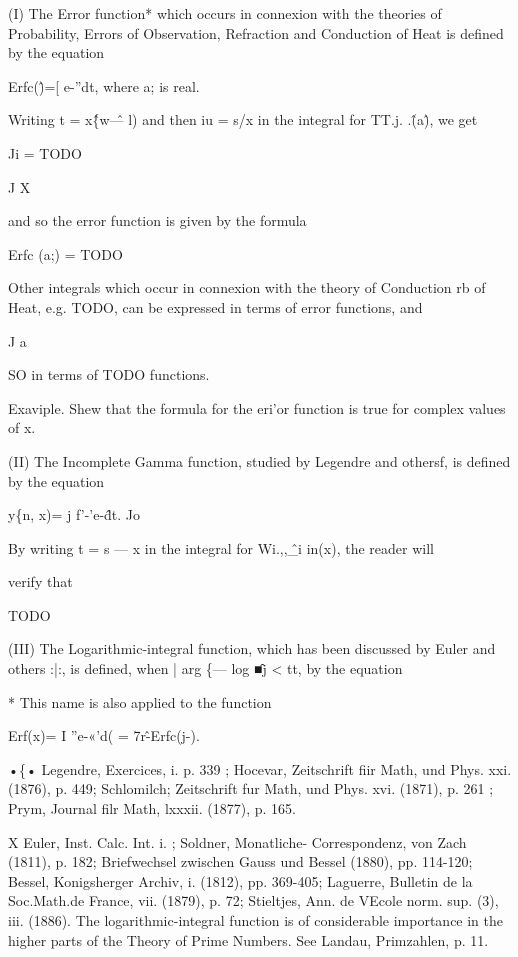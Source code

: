 %
%
(I) The Error function* which occurs in connexion with the theories of
Probability, Errors of Observation, Refraction and Conduction of Heat
is defined by the equation

Erfc(\^)=[ e-''dt, where a; is real.

Writing t = x\^\{w\^ — l) and then iu = s/x in the integral for TT.j.
.\^(a\^), we get

Ji = TODO

J X

and so the error function is given by the formula

Erfc (a;) = TODO

Other integrals which occur in connexion with the theory of Conduction
rb of Heat, e.g. TODO, can be expressed in terms of error functions,
and

J a

SO in terms of TODO functions.

Exaviple. Shew that the formula for the eri'or function is true for
complex values of x.

(II) The Incomplete Gamma function, studied by Legendre and othersf,
is defined by the equation

y\{n, x)= j f'-'e-\^dt. Jo

By writing t = s — x in the integral for Wi.,,\^\_i in(x), the reader
will

verify that

TODO

(III) The Logarithmic-integral function, which has been discussed by
Euler and others :|:, is defined, when | arg \{— log \^■j < tt, by the
equation

* This name is also applied to the function

Erf(x)= I ''e-«'d( = 7r\^-Erfc(j-).

•\{• Legendre, Exercices, i. p. 339 ; Hocevar, Zeitschrift fiir Math,
und Phys. xxi. (1876), p. 449; Schlomilch; Zeitschrift fur Math, und
Phys. xvi. (1871), p. 261 ; Prym, Journal filr Math, lxxxii. (1877),
p. 165.

X Euler, Inst. Calc. Int. i. ; Soldner, Monatliche- Correspondenz, von
Zach (1811), p. 182; Briefwechsel zwischen Gauss und Bessel (1880),
pp. 114-120; Bessel, Konigsherger Archiv, i. (1812), pp. 369-405;
Laguerre, Bulletin de la Soc.Math.de France, vii. (1879), p. 72;
Stieltjes, Ann. de VEcole norm. sup. (3), iii. (1886). The
logarithmic-integral function is of considerable importance in the
higher parts of the Theory of Prime Numbers. See Landau, Primzahlen,
p. 11.



